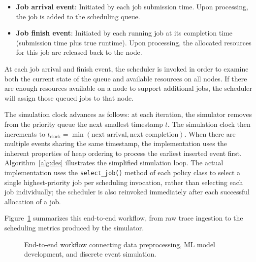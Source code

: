 \begin{itemize}
    \item \textbf{Job arrival event}: Initiated by each job submission time. Upon processing, the job is added to the scheduling queue. 
    \item \textbf{Job finish event}: Initiated by each running job at its completion time (submission time plus true runtime). Upon processing, the allocated resources for this job are released back to the node.
\end{itemize}

At each job arrival and finish event, the scheduler is invoked in order to examine both the current state of the queue and available resources on all nodes. If there are enough resources available on a node to support additional jobs, the scheduler will assign those queued jobs to that node.

The simulation clock advances as follows: at each iteration, the simulator removes from the priority queue the next smallest timestamp $t$. The simulation clock then increments to $t_{\text{clock}}=\min(\text{next arrival}, \text{next completion})$. When there are multiple events sharing the same timestamp, the implementation uses the inherent properties of heap ordering to process the earliest inserted event first. Algorithm~\ref{alg:des} illustrates the simplified simulation loop. The actual implementation uses the \texttt{select\_job()} method of each policy class to select a single highest-priority job per scheduling invocation, rather than selecting each job individually; the scheduler is also reinvoked immediately after each successful allocation of a job.

Figure~\ref{fig:pipeline_workflow} summarizes this end-to-end workflow, from raw trace ingestion to the scheduling metrics produced by the simulator.

\begin{figure}[htbp]
\centering
{}
\caption[End-to-end simulation pipeline]{End-to-end workflow connecting data preprocessing, ML model development, and discrete event simulation.}
\label{fig:pipeline_workflow}
\end{figure}

